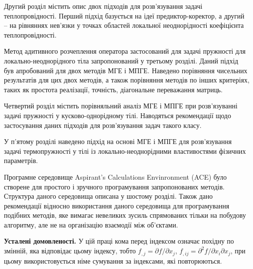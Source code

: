 Другий розділ містить опис двох підходів для розв'язування задачі теплопровідності. Перший підхід базується на ідеї
предиктор-коректор, а другий -- на рівняннях нев'язки у точках областей локальної неоднорідності коефіцієнта
теплопровідності.

Метод адитивного розчеплення оператора застосований для задачі пружності для локально-неоднорідного тіла запропонований
у третьому розділі. Даний підхід був апробований для двох методів МГЕ і МПГЕ. Наведено порівняння чисельних результатів
для цих двох методів, а також порівняння методів по інших критеріях, таких як простота реалізації, точність, діагональне
переважання матриць.

Четвертий розділ містить порівняльний аналіз МГЕ і МПГЕ при розв'язуванні задачі пружності у кусково-однорідному тілі.
Наводяться рекомендації щодо застосування даних підходів для розв'язування задач такого класу.

У п'ятому розділі наведено підхід на основі МГЕ і МПГЕ для розв'язування задачі термопружності у тілі із
локально-неоднорідними властивостями фізичних параметрів.

Програмне середовище Aspirant's Calculations Envinronment (ACE) було створене для простого і зручного програмування
запропонованих методів. Структура даного середовища описана у шостому розділі. Також дано рекомендації відносно
використання даного середовища для програмування подібних методів, яке вимагає невеликих зусиль спрямованих тільки на
побудову алгоритму, але не на організацію взаємодії між об'єктами.

\textbf{Усталені домовленості.} У цій праці кома перед індексом означає похідну по змінній, яка відповідає цьому
індексу, тобто ${f_{,j} = \partial}{f/\partial}x_{j}$, ${{f_{,ij} = \partial^{2}}{f/\partial}x_{i}\partial x_{j}}{}$,
при цьому викори­стовується німе сумування за індек­сами, які повторюються.
